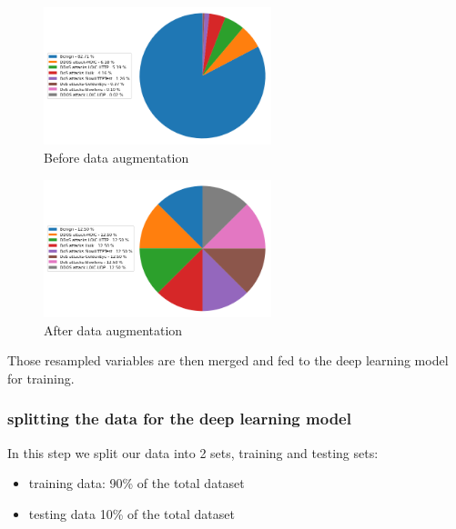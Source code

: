 \begin{figure}[h]
	\centering
	\includegraphics[width=250px]{figures/unbalanced_donut.png}
	\caption{Before data augmentation}
	\label{fig:datasample}
\end{figure}
\begin{figure}[h]
	\centering
	\includegraphics[width=250px]{figures/balanced_donut.png}
	\caption{After data augmentation}
	\label{fig:datasample}
\end{figure}

Those resampled variables are then merged and fed to the deep learning model for training.






\subsubsection{splitting the data for the deep learning model}
In this step we split our data into 2 sets, training and testing sets:
\begin{itemize}
	\item training data: 90\% of the total dataset
	\item testing data 10\% of the total dataset
\end{itemize}

















